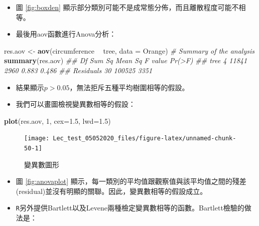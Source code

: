 \documentclass[hyperref,]{ctexart}
\newenvironment{Shaded}{\begin{snugshade}}{\end{snugshade}}
\newcommand{\CommentTok}[1]{\textcolor[rgb]{0.56,0.35,0.01}{\textit{#1}}}
\newcommand{\DataTypeTok}[1]{\textcolor[rgb]{0.13,0.29,0.53}{#1}}
\newcommand{\DecValTok}[1]{\textcolor[rgb]{0.00,0.00,0.81}{#1}}
\newcommand{\FloatTok}[1]{\textcolor[rgb]{0.00,0.00,0.81}{#1}}
\newcommand{\KeywordTok}[1]{\textcolor[rgb]{0.13,0.29,0.53}{\textbf{#1}}}
\newcommand{\NormalTok}[1]{#1}
\newcommand{\OperatorTok}[1]{\textcolor[rgb]{0.81,0.36,0.00}{\textbf{#1}}}
\newcommand{\StringTok}[1]{\textcolor[rgb]{0.31,0.60,0.02}{#1}}
\begin{document}
\begin{itemize}
\item
  圖 \ref{fig:boxden}
  顯示部分類別可能不是成常態分佈，而且離散程度可能不相等。
\item
  最後用aov函數進行Anova分析：
\end{itemize}

\begin{Shaded}
\begin{Highlighting}[]
\NormalTok{res.aov <-}\StringTok{ }\KeywordTok{aov}\NormalTok{(circumference }\OperatorTok{~}\StringTok{ }\NormalTok{tree, }\DataTypeTok{data =}\NormalTok{ Orange)}
\CommentTok{# Summary of the analysis}
\KeywordTok{summary}\NormalTok{(res.aov)}
\CommentTok{##             Df Sum Sq Mean Sq F value Pr(>F)}
\CommentTok{## tree         4  11841    2960   0.883  0.486}
\CommentTok{## Residuals   30 100525    3351}
\end{Highlighting}
\end{Shaded}

\begin{itemize}
\item
  結果顯示\(p>0.05\)，無法拒斥五種平均樹圍相等的假設。
\item
  我們可以畫圖檢視變異數相等的假設：
\end{itemize}

\begin{Shaded}
\begin{Highlighting}[]
\KeywordTok{plot}\NormalTok{(res.aov, }\DecValTok{1}\NormalTok{, }\DataTypeTok{cex=}\FloatTok{1.5}\NormalTok{, }\DataTypeTok{lwd=}\FloatTok{1.5}\NormalTok{)}
\end{Highlighting}
\end{Shaded}

\begin{figure}

\texttt{[image: Lec\_test\_05052020\_files/figure-latex/unnamed-chunk-50-1]} \hfill{}

\caption{\label{fig:anovaplot}變異數圖形}\label{fig:unnamed-chunk-50}
\end{figure}

\begin{itemize}
\item
  圖 \ref{fig:anovaplot}
  顯示，每一類別的平均值跟觀察值與該平均值之間的殘差(residual)並沒有明顯的關聯。因此，變異數相等的假設成立。
\item
  \texttt{R}另外提供Bartlett以及Levene兩種檢定變異數相等的函數。Bartlett檢驗的做法是：
\end{itemize}
\end{document}
